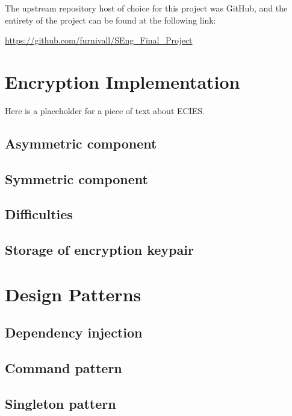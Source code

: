 \documentclass{mproj}
\begin{document}
The upstream repository host of choice for this project was GitHub, and the entirety of the project can be found at the following link: 

\begin{center}
\href{https://github.com/furnivall/SEng_Final_Project}{https://github.com/furnivall/SEng\_Final\_Project}
\end{center}

\section{Encryption Implementation}\label{encryption}
\cite{martinez2010comparison}Here is a placeholder for a piece of text about ECIES.
\subsection{Asymmetric component}\label{asymmetric}

\subsection{Symmetric component}\label{symmetric}

\subsection{Difficulties}\label{encryptionDifficulties}

\subsection{Storage of encryption keypair}

\section{Design Patterns}

\subsection{Dependency injection}

\subsection{Command pattern}

\subsection{Singleton pattern}
\end{document}
